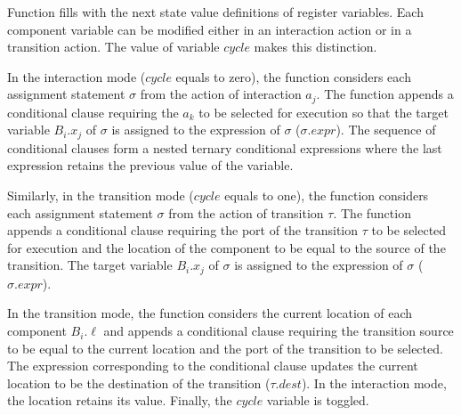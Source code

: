 Function  fills  with the next state value definitions of register variables. Each component variable can be modified either in an interaction action or in a transition action. The value of variable $cycle$ makes this distinction. 

In the interaction mode ($cycle$ equals to zero), the function considers each assignment statement $\sigma$ from the action of interaction $a_j$. The function appends a conditional clause requiring the $a_k$ to be selected for execution so that the target variable $B_i.x_j$ of $\sigma$ is assigned to the expression of $\sigma$ ($\sigma.expr$). The sequence of conditional clauses form a nested ternary conditional expressions where the last expression retains the previous value of the variable. 

Similarly, in the transition mode ($cycle$ equals to one), the function considers each assignment statement $\sigma$ from the action of transition $\tau$. The function appends a conditional clause requiring the port of the transition $\tau$ to be selected for execution and the location of the component to be equal to the source of the transition. The target variable $B_i.x_j$ of $\sigma$ is assigned to the expression of $\sigma$ ($\sigma.expr$). 

In the transition mode, the function considers the current location of each component $B_i.\ell$ and appends a conditional clause requiring the transition source to be equal to the current location and the port of the transition to be selected. The expression corresponding to the conditional clause updates the current location to be the destination of the transition ($\tau.dest$).  In the interaction mode, the location retains its value. Finally, the $cycle$ variable is toggled. 

